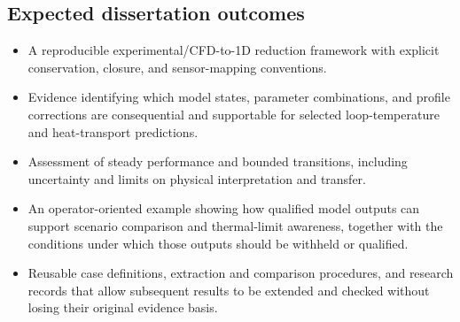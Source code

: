 \subsection{Expected dissertation outcomes}\label{subsec:expected-dissertation-outcomes}
\begin{itemize}[leftmargin=*]
\item A reproducible experimental/CFD-to-1D reduction framework with explicit conservation, closure, and sensor-mapping conventions.
\item Evidence identifying which model states, parameter combinations, and profile corrections are consequential and supportable for selected loop-temperature and heat-transport predictions.
\item Assessment of steady performance and bounded transitions, including uncertainty and limits on physical interpretation and transfer.
\item An operator-oriented example showing how qualified model outputs can support scenario comparison and thermal-limit awareness, together with the conditions under which those outputs should be withheld or qualified.
\item Reusable case definitions, extraction and comparison procedures, and research records that allow subsequent results to be extended and checked without losing their original evidence basis.
\end{itemize}
